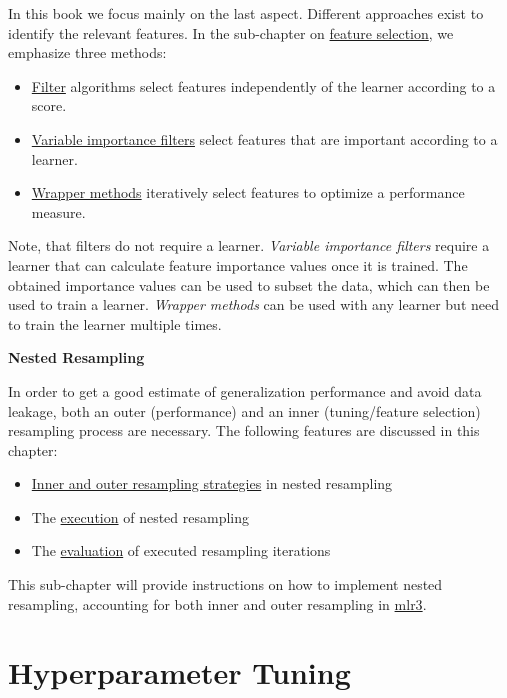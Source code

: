\documentclass[
]{scrbook}
\providecommand{\tightlist}{%
  \setlength{\itemsep}{0pt}\setlength{\parskip}{0pt}}
\begin{document}
In this book we focus mainly on the last aspect.
Different approaches exist to identify the relevant features.
In the sub-chapter on \protect\hyperlink{fs}{feature selection}, we emphasize three methods:

\begin{itemize}
\tightlist
\item
  \protect\hyperlink{fs-filter}{Filter} algorithms select features independently of the learner according to a score.
\item
  \protect\hyperlink{fs-var-imp-filters}{Variable importance filters} select features that are important according to a learner.
\item
  \protect\hyperlink{fs-wrapper}{Wrapper methods} iteratively select features to optimize a performance measure.
\end{itemize}

Note, that filters do not require a learner.
\emph{Variable importance filters} require a learner that can calculate feature importance values once it is trained.
The obtained importance values can be used to subset the data, which can then be used to train a learner.
\emph{Wrapper methods} can be used with any learner but need to train the learner multiple times.

\textbf{Nested Resampling}

In order to get a good estimate of generalization performance and avoid data leakage, both an outer (performance) and an inner (tuning/feature selection) resampling process are necessary.
The following features are discussed in this chapter:

\begin{itemize}
\tightlist
\item
  \protect\hyperlink{nested-resampling}{Inner and outer resampling strategies} in nested resampling
\item
  The \protect\hyperlink{nested-resamp-exec}{execution} of nested resampling
\item
  The \protect\hyperlink{nested-resamp-eval}{evaluation} of executed resampling iterations
\end{itemize}

This sub-chapter will provide instructions on how to implement nested resampling, accounting for both inner and outer resampling in \href{https://mlr3.mlr-org.com}{mlr3}.

\hypertarget{tuning}{%
\section{Hyperparameter Tuning}\label{tuning}}
\end{document}
